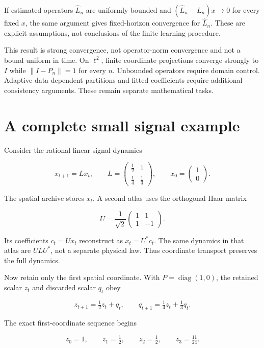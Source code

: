 If estimated operators \(\widehat L_n\) are uniformly bounded and
\((\widehat L_n-L_n)x\to0\) for every fixed \(x\), the same argument
gives fixed-horizon convergence for \(\widehat L_n\). These are explicit
assumptions, not conclusions of the finite learning procedure.

This result is strong convergence, not operator-norm convergence and not
a bound uniform in time. On \(\ell^2\), finite coordinate projections
converge strongly to \(I\) while \(\|I-P_n\|=1\) for every \(n\).
Unbounded operators require domain control. Adaptive data-dependent
partitions and fitted coefficients require additional consistency
arguments. These remain separate mathematical tasks.

\section{A complete small signal example}\label{LSM:a-complete-small-signal-example}

Consider the rational linear signal dynamics

\[
x_{t+1}=Lx_t,\qquad
L=\begin{pmatrix}\tfrac12&1\\[2pt]\tfrac14&\tfrac13\end{pmatrix},
\qquad x_0=\begin{pmatrix}1\\0\end{pmatrix}.
\]

The spatial archive stores \(x_t\). A second atlas uses the orthogonal
Haar matrix

\[
U=\frac{1}{\sqrt2}\begin{pmatrix}1&1\\1&-1\end{pmatrix}.
\]

Its coefficients \(c_t=Ux_t\) reconstruct as \(x_t=U^*c_t\). The same
dynamics in that atlas are \(ULU^*\), not a separate physical law. Thus
coordinate transport preserves the full dynamics.

Now retain only the first spatial coordinate. With
\(P=\operatorname{diag}(1,0)\), the retained scalar \(z_t\) and
discarded scalar \(q_t\) obey

\[
z_{t+1}=\tfrac12z_t+q_t,\qquad
q_{t+1}=\tfrac14z_t+\tfrac13q_t.
\]

The exact first-coordinate sequence begins

\[
z_0=1,\qquad z_1=\tfrac12,\qquad z_2=\tfrac12,
\qquad z_3=\tfrac{11}{24}.
\]

